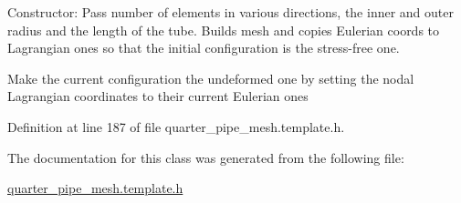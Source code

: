 Constructor\+: Pass number of elements in various directions, the inner and outer radius and the length of the tube. Builds mesh and copies Eulerian coords to Lagrangian ones so that the initial configuration is the stress-\/free one. 

Make the current configuration the undeformed one by setting the nodal Lagrangian coordinates to their current Eulerian ones 

Definition at line 187 of file quarter\+\_\+pipe\+\_\+mesh.\+template.\+h.



The documentation for this class was generated from the following file\+:\begin{DoxyCompactItemize}
\item 
\hyperlink{quarter__pipe__mesh_8template_8h}{quarter\+\_\+pipe\+\_\+mesh.\+template.\+h}\end{DoxyCompactItemize}
